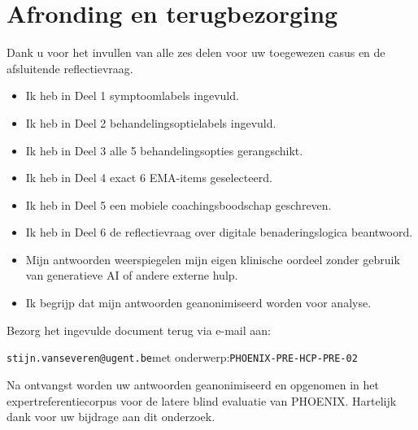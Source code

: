 \documentclass[11pt,a4paper]{article}
\begin{document}
\section{Afronding en terugbezorging}

Dank u voor het invullen van alle zes delen voor uw toegewezen casus
en de afsluitende reflectievraag.

\begin{instrbox}[title=Checklist voor terugbezorging]
\begin{itemize}
\item[$\square$] Ik heb in Deel 1 symptoomlabels ingevuld.
\item[$\square$] Ik heb in Deel 2 behandelingsoptielabels ingevuld.
\item[$\square$] Ik heb in Deel 3 alle 5 behandelingsopties gerangschikt.
\item[$\square$] Ik heb in Deel 4 exact 6 EMA-items geselecteerd.
\item[$\square$] Ik heb in Deel 5 een mobiele coachingsboodschap geschreven.
\item[$\square$] Ik heb in Deel 6 de reflectievraag over digitale benaderingslogica beantwoord.
\item[$\square$] Mijn antwoorden weerspiegelen mijn eigen klinische oordeel zonder gebruik van generatieve AI of andere externe hulp.
\item[$\square$] Ik begrijp dat mijn antwoorden geanonimiseerd worden voor analyse.
\end{itemize}
\end{instrbox}

\medskip
Bezorg het ingevulde document terug via e-mail aan:
\begin{center}
\texttt{stijn.vanseveren@ugent.be}\quad met onderwerp:\quad \texttt{PHOENIX-PRE-HCP-PRE-02}
\end{center}

\vspace{0.5em}
\begin{tcolorbox}[colback=AccentBlue,colframe=PrimaryBlue,arc=2mm,boxrule=0.6pt,left=8pt,right=8pt,top=7pt,bottom=7pt]
\small\centering
Na ontvangst worden uw antwoorden geanonimiseerd en opgenomen in het expertreferentiecorpus
voor de latere blind evaluatie van PHOENIX. Hartelijk dank voor uw bijdrage aan dit onderzoek.
\end{tcolorbox}
\end{document}

